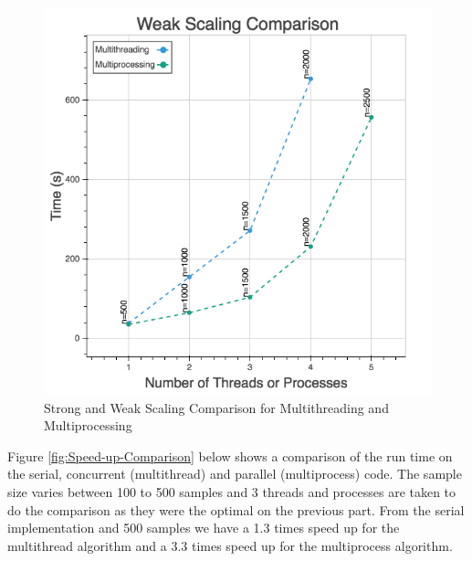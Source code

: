 \documentclass[10pt,twocolumn,letterpaper]{article}
\begin{document}
\begin{figure}[htbp]
\begin{center}
\includegraphics[scale=0.35]{figure/mt_mp_ws_comp.png}
\end{center}
\caption{\label{fig:Strong-and-Weak}Strong and Weak Scaling Comparison for
Multithreading and Multiprocessing}
\end{figure}


Figure \ref{fig:Speed-up-Comparison} below shows a comparison of
the run time on the serial, concurrent (multithread) and parallel
(multiprocess) code. The sample size varies between 100 to 500 samples
and 3 threads and processes are taken to do the comparison as they
were the optimal on the previous part. From the serial implementation
and 500 samples we have a 1.3 times speed up for the multithread algorithm
and a 3.3 times speed up for the multiprocess algorithm.
\end{document}
